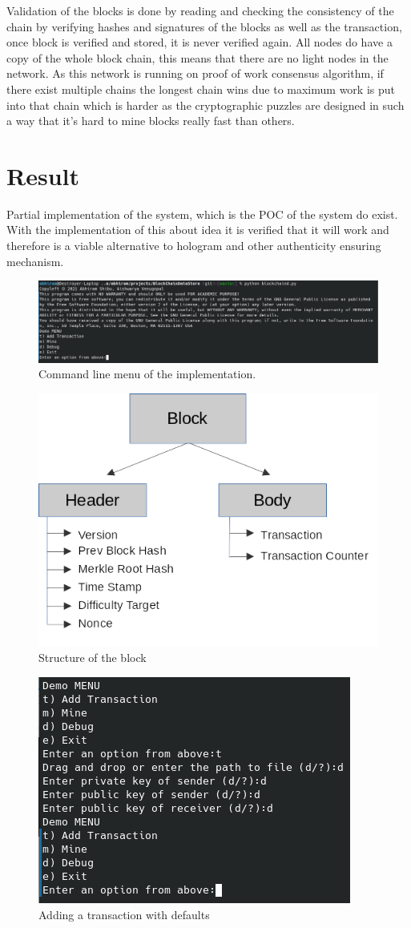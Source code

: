 \documentclass[conference]{IEEEtran}
\begin{document}
Validation of the blocks is done by reading and checking the consistency of the chain by verifying hashes and signatures of the blocks as well as the transaction, once block is verified and stored, it is never verified again. All nodes do have a copy of the whole block chain, this means that there are no light nodes in the network. As this network is running on proof of work consensus algorithm, if there exist multiple chains the longest chain wins due to maximum work is put into that chain which is harder as the cryptographic puzzles are designed in such a way that it's hard to mine blocks really fast than others. 
\section{Result}
Partial implementation of the system, which is the POC of the system do exist. With the implementation of this about idea it is verified that it will work and therefore is a viable alternative to hologram and other authenticity ensuring mechanism.  
\begin{figure}[h!]
	\centering
	\includegraphics[width=0.7\linewidth]{Menu}
	\caption{Command line menu of the implementation.}
	\label{fig:menu}
\end{figure}
\begin{figure}[h!]
	\centering
	\includegraphics[width=0.7\linewidth]{BlockStructure}
	\caption{Structure of the block}
	\label{fig:blockstructure}
\end{figure}
\begin{figure}[h!]
	\centering
	\includegraphics[width=0.7\linewidth]{AddingTransaction}
	\caption{Adding a transaction with defaults}
	\label{fig:addingtransaction}
\end{figure}
\end{document}
